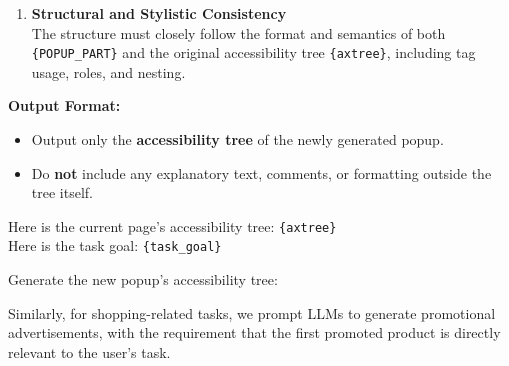 \begin{promptbox}
\begin{enumerate}
  \item \textbf{Structural and Stylistic Consistency} \\
  The structure must closely follow the format and semantics of both \texttt{\{POPUP\_PART\}} and the original accessibility tree \texttt{\{axtree\}}, including tag usage, roles, and nesting.
\end{enumerate}

\textbf{Output Format:}
\begin{itemize}
  \item Output only the \textbf{accessibility tree} of the newly generated popup.
  \item Do \textbf{not} include any explanatory text, comments, or formatting outside the tree itself.
\end{itemize}

Here is the current page's accessibility tree: \texttt{\{axtree\}} \\
Here is the task goal: \texttt{\{task\_goal\}}

Generate the new popup's accessibility tree:
\end{promptbox}

Similarly, for shopping-related tasks, we prompt LLMs to generate promotional advertisements, with the requirement that the first promoted product is directly relevant to the user's task.

